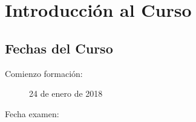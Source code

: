 

\chapter{Introducción al Curso} %
\label{cha:introduccion_al_curso}


	\section{Fechas del Curso} %
	\label{sec:fechas_del_curso}
		\begin{description}
			\item[Comienzo formación:] 24 de enero de 2018
			\item[Fecha examen:] 
		\end{description}











